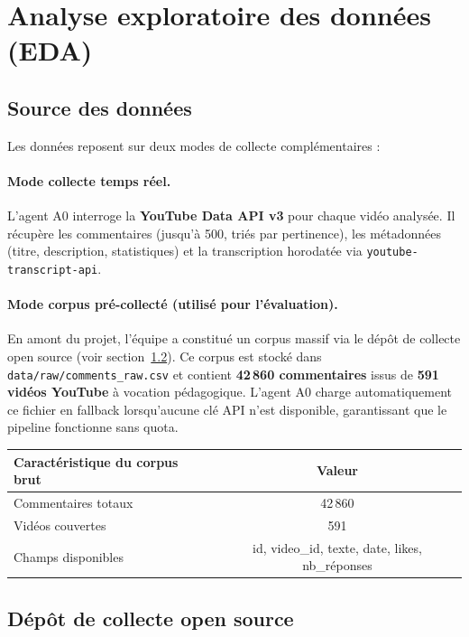 \documentclass[12pt, a4paper]{article}
\begin{document}
\section{Analyse exploratoire des données (EDA)}

\subsection{Source des données}

Les données reposent sur deux modes de collecte complémentaires :

\paragraph{Mode collecte temps réel.}
L'agent A0 interroge la \textbf{YouTube Data API v3} pour chaque vidéo analysée.
Il récupère les commentaires (jusqu'à 500, triés par pertinence), les métadonnées
(titre, description, statistiques) et la transcription horodatée
via \texttt{youtube-transcript-api}.

\paragraph{Mode corpus pré-collecté (utilisé pour l'évaluation).}
En amont du projet, l'équipe a constitué un corpus massif via le dépôt de
collecte open source (voir section~\ref{sec:github}). Ce corpus est stocké
dans \texttt{data/raw/comments\_raw.csv} et contient \textbf{42\,860 commentaires}
issus de \textbf{591 vidéos YouTube} à vocation pédagogique.
L'agent A0 charge automatiquement ce fichier en fallback lorsqu'aucune clé API
n'est disponible, garantissant que le pipeline fonctionne sans quota.

\begin{center}
\begin{tabular}{lc}
\toprule
Caractéristique du corpus brut & Valeur \\
\midrule
Commentaires totaux & 42\,860 \\
Vidéos couvertes    & 591 \\
Champs disponibles  & id, video\_id, texte, date, likes, nb\_réponses \\
\bottomrule
\end{tabular}
\end{center}

\subsection{Dépôt de collecte open source}
\label{sec:github}
\end{document}
